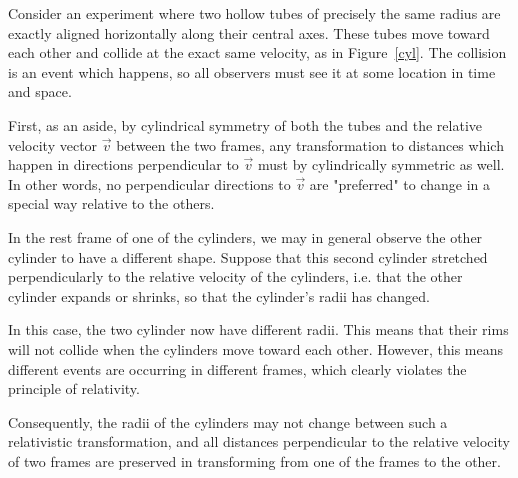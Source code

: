 \documentclass[11pt]{article}
\begin{document}
\begin{sidebox}[Lemma 2]

Consider an experiment where two hollow tubes of precisely the same radius are exactly aligned horizontally along their central axes. These tubes move toward each other and collide at the exact same velocity, as in Figure~\ref{cyl}. The collision is an event which happens, so all observers must see it at some location in time and space.

	First, as an aside, by cylindrical symmetry of both the tubes and the relative velocity vector $\vec{v}$ between the two frames, any transformation to distances which happen in directions perpendicular to $\vec{v}$ must by cylindrically symmetric as well. In other words, no perpendicular directions to $\vec{v}$ are "preferred" to change in a special way relative to the others.

In the rest frame of one of the cylinders, we may in general observe the other cylinder to have a different shape. Suppose that this second cylinder stretched perpendicularly to the relative velocity of the cylinders, i.e. that the other cylinder expands or shrinks, so that the cylinder's radii has changed.

In this case, the two cylinder now have different radii. This means that their rims will not collide when the cylinders move toward each other. However, this means different events are occurring in different frames, which clearly violates the principle of relativity. 

Consequently, the radii of the cylinders may not change between such a relativistic transformation, and all distances perpendicular to the relative velocity of two frames are preserved in transforming from one of the frames to the other.

\end{sidebox}
\end{document}
